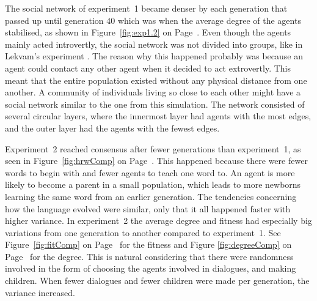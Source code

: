The social network of experiment~1 became denser by each generation that passed up until generation $40$ which was when the average degree of the agents stabilised, as shown in Figure~\ref{fig:exp1.2} on Page~\pageref{fig:exp1.2}. Even though the agents mainly acted introvertly, the social network was not divided into groups, like in Lekvam’s experiment \citep[Section 5.1]{lekvam2014co}. The reason why this happened probably was because an agent could contact any other agent when it decided to act extrovertly. This meant that the entire population existed without any physical distance from one another. A community of individuals living so close to each other might have a social network similar to the one from this simulation. The network consisted of several circular layers, where the innermost layer had agents with the most edges, and the outer layer had the agents with the fewest edges.

Experiment~2 reached consensus after fewer generations than experiment~1, as seen in Figure~\ref{fig:hrwComp} on Page~\pageref{fig:hrwComp}. This happened because there were fewer words to begin with and fewer agents to teach one word to. An agent is more likely to become a parent in a small population, which leads to more newborns learning the same word from an earlier generation. The tendencies concerning how the language evolved were similar, only that it all happened faster with higher variance. In experiment~2 the average degree and fitness had especially big variations from one generation to another compared to experiment~1. See Figure~\ref{fig:fitComp} on Page~\pageref{fig:fitComp} for the fitness and Figure \ref{fig:degreeComp} on Page~\pageref{fig:degreeComp} for the degree. This is natural considering that there were randomness involved in the form of choosing the agents involved in dialogues, and making children. When fewer dialogues and fewer children were made per generation, the variance increased.

